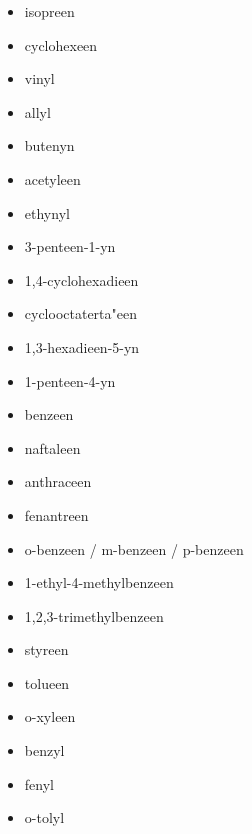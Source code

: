 \documentclass[a4paper,12pt]{article}
\begin{document}
\begin{enumerate}
\begin{itemize}
                \item isopreen
                \item cyclohexeen
                \item vinyl
                \item allyl
                \item butenyn
                \item acetyleen
                \item ethynyl
                \item 3-penteen-1-yn                                                                                                                                                   
                \item 1,4-cyclohexadieen
                \item cyclooctaterta"een
                \item 1,3-hexadieen-5-yn
                \item 1-penteen-4-yn
                \item benzeen
                \item naftaleen
                \item anthraceen
                \item fenantreen
                \item o-benzeen / m-benzeen / p-benzeen
                \item 1-ethyl-4-methylbenzeen
                \item 1,2,3-trimethylbenzeen
                \item styreen
                \item tolueen
                \item o-xyleen
                \item benzyl
                \item fenyl
                \item o-tolyl
            \end{itemize}

\end{enumerate}
\end{document}

